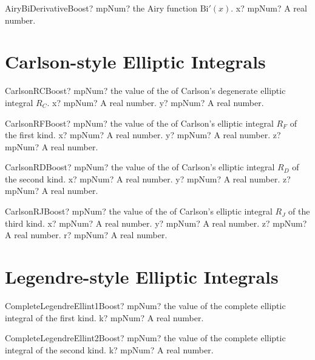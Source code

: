 \documentclass[12pt,a4paper,openany]{book}
\begin{document}
\begin{mpFunctionsExtract}
\mpFunctionOne
{AiryBiDerivativeBoost? mpNum? the Airy function $\text{Bi}'(x)$.}
{x? mpNum? A real number.}
\end{mpFunctionsExtract}

\section{Carlson-style Elliptic Integrals}

\begin{mpFunctionsExtract}
\mpFunctionTwo
{CarlsonRCBoost? mpNum? the value of the of Carlson's degenerate elliptic integral $R_C$.}
{x? mpNum? A real number.}
{y? mpNum? A real number.}
\end{mpFunctionsExtract}

\begin{mpFunctionsExtract}
\mpFunctionThree
{CarlsonRFBoost? mpNum? the value of the of Carlson's elliptic integral $R_F$ of the first kind.}
{x? mpNum? A real number.}
{y? mpNum? A real number.}
{z? mpNum? A real number.}
\end{mpFunctionsExtract}

\begin{mpFunctionsExtract}
\mpFunctionThree
{CarlsonRDBoost? mpNum? the value of the of Carlson's elliptic integral $R_D$ of the second kind.}
{x? mpNum? A real number.}
{y? mpNum? A real number.}
{z? mpNum? A real number.}
\end{mpFunctionsExtract}

\begin{mpFunctionsExtract}
\mpFunctionFour
{CarlsonRJBoost? mpNum? the value of the of Carlson's elliptic integral $R_J$ of the third kind.}
{x? mpNum? A real number.}
{y? mpNum? A real number.}
{z? mpNum? A real number.}
{r? mpNum? A real number.}
\end{mpFunctionsExtract}

\section{Legendre-style Elliptic Integrals}

\begin{mpFunctionsExtract}

\mpFunctionOne
{CompleteLegendreEllint1Boost? mpNum? the value of the complete elliptic integral of the first kind.}
{k? mpNum? A real number.}
\end{mpFunctionsExtract}

\begin{mpFunctionsExtract}
\mpFunctionOne
{CompleteLegendreEllint2Boost? mpNum? the value of the complete elliptic integral of the second kind.}
{k? mpNum? A real number.}
\end{mpFunctionsExtract}
\end{document}
